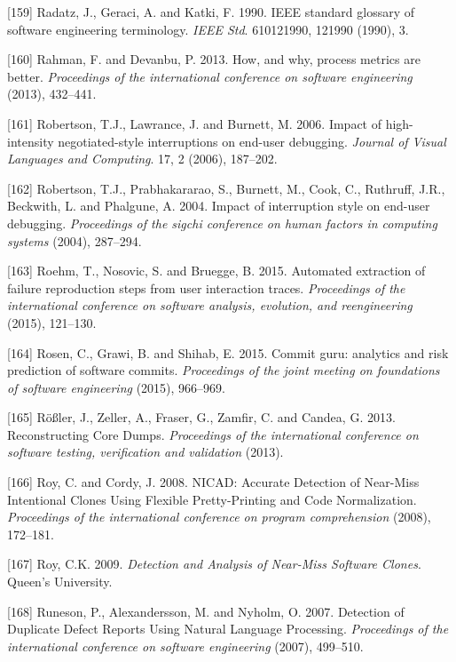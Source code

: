 \documentclass[12pt]{report}
\begin{document}
\hypertarget{ref-Radatz1990}{}
{[}159{]} Radatz, J., Geraci, A. and Katki, F. 1990. IEEE standard
glossary of software engineering terminology. \emph{IEEE Std}.
610121990, 121990 (1990), 3.

\hypertarget{ref-rahman2013}{}
{[}160{]} Rahman, F. and Devanbu, P. 2013. How, and why, process metrics
are better. \emph{Proceedings of the international conference on
software engineering} (2013), 432--441.

\hypertarget{ref-Robertson2006}{}
{[}161{]} Robertson, T.J., Lawrance, J. and Burnett, M. 2006. Impact of
high-intensity negotiated-style interruptions on end-user debugging.
\emph{Journal of Visual Languages and Computing}. 17, 2 (2006),
187--202.

\hypertarget{ref-Robertson2004}{}
{[}162{]} Robertson, T.J., Prabhakararao, S., Burnett, M., Cook, C.,
Ruthruff, J.R., Beckwith, L. and Phalgune, A. 2004. Impact of
interruption style on end-user debugging. \emph{Proceedings of the
sigchi conference on human factors in computing systems} (2004),
287--294.

\hypertarget{ref-Roehm2015}{}
{[}163{]} Roehm, T., Nosovic, S. and Bruegge, B. 2015. Automated
extraction of failure reproduction steps from user interaction traces.
\emph{Proceedings of the international conference on software analysis,
evolution, and reengineering} (2015), 121--130.

\hypertarget{ref-Rosen2015}{}
{[}164{]} Rosen, C., Grawi, B. and Shihab, E. 2015. Commit guru:
analytics and risk prediction of software commits. \emph{Proceedings of
the joint meeting on foundations of software engineering} (2015),
966--969.

\hypertarget{ref-Rossler2013}{}
{[}165{]} Rößler, J., Zeller, A., Fraser, G., Zamfir, C. and Candea, G.
2013. Reconstructing Core Dumps. \emph{Proceedings of the international
conference on software testing, verification and validation} (2013).

\hypertarget{ref-Roy2008}{}
{[}166{]} Roy, C. and Cordy, J. 2008. NICAD: Accurate Detection of
Near-Miss Intentional Clones Using Flexible Pretty-Printing and Code
Normalization. \emph{Proceedings of the international conference on
program comprehension} (2008), 172--181.

\hypertarget{ref-Iss2009}{}
{[}167{]} Roy, C.K. 2009. \emph{Detection and Analysis of Near-Miss
Software Clones}. Queen's University.

\hypertarget{ref-Runeson2007}{}
{[}168{]} Runeson, P., Alexandersson, M. and Nyholm, O. 2007. Detection
of Duplicate Defect Reports Using Natural Language Processing.
\emph{Proceedings of the international conference on software
engineering} (2007), 499--510.
\end{document}
